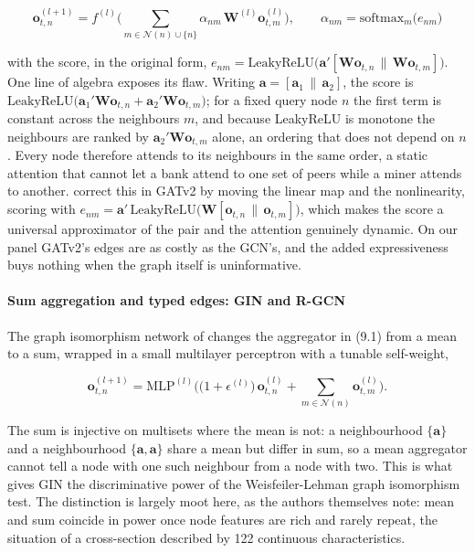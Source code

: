 \begin{equation}
\label{eq_gnn_4}
\mathbf{o}_{t,n}^{(l+1)} = f^{(l)}\!\Big( \sum_{m \in \mathcal{N}(n) \cup \{n\}} \alpha_{nm}\, \mathbf{W}^{(l)} \mathbf{o}_{t,m}^{(l)} \Big), \qquad \alpha_{nm} = \mathrm{softmax}_m\big(e_{nm}\big)
\end{equation}

with the score, in the original form, $e_{nm} = \mathrm{LeakyReLU}\big( \mathbf{a}'[\mathbf{W}\mathbf{o}_{t,n} \,\|\, \mathbf{W}\mathbf{o}_{t,m}] \big)$. One line of algebra exposes its flaw. Writing $\mathbf{a} = [\mathbf{a}_1 \,\|\, \mathbf{a}_2]$, the score is $\mathrm{LeakyReLU}\big(\mathbf{a}_1'\mathbf{W}\mathbf{o}_{t,n} + \mathbf{a}_2'\mathbf{W}\mathbf{o}_{t,m}\big)$; for a fixed query node $n$ the first term is constant across the neighbours $m$, and because LeakyReLU is monotone the neighbours are ranked by $\mathbf{a}_2'\mathbf{W}\mathbf{o}_{t,m}$ alone, an ordering that does not depend on $n$. Every node therefore attends to its neighbours in the same order, a static attention that cannot let a bank attend to one set of peers while a miner attends to another. \cite{brody2022attentive} correct this in GATv2 by moving the linear map and the nonlinearity, scoring with $e_{nm} = \mathbf{a}'\,\mathrm{LeakyReLU}\big(\mathbf{W}[\mathbf{o}_{t,n} \,\|\, \mathbf{o}_{t,m}]\big)$, which makes the score a universal approximator of the pair and the attention genuinely dynamic. On our panel GATv2's edges are as costly as the GCN's, and the added expressiveness buys nothing when the graph itself is uninformative.

\paragraph{Sum aggregation and typed edges: GIN and R-GCN}\label{sec_gnn_gin}

The graph isomorphism network of \cite{xu2019powerful} changes the aggregator in (9.1) from a mean to a sum, wrapped in a small multilayer perceptron with a tunable self-weight,

\begin{equation}
\label{eq_gnn_5}
\mathbf{o}_{t,n}^{(l+1)} = \mathrm{MLP}^{(l)}\!\Big( \big(1 + \epsilon^{(l)}\big)\,\mathbf{o}_{t,n}^{(l)} + \sum_{m \in \mathcal{N}(n)} \mathbf{o}_{t,m}^{(l)} \Big).
\end{equation}

The sum is injective on multisets where the mean is not: a neighbourhood $\{\mathbf{a}\}$ and a neighbourhood $\{\mathbf{a}, \mathbf{a}\}$ share a mean but differ in sum, so a mean aggregator cannot tell a node with one such neighbour from a node with two. This is what gives GIN the discriminative power of the Weisfeiler-Lehman graph isomorphism test. The distinction is largely moot here, as the authors themselves note: mean and sum coincide in power once node features are rich and rarely repeat, the situation of a cross-section described by 122 continuous characteristics.

